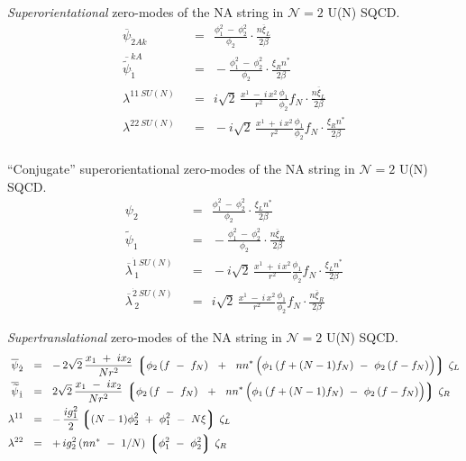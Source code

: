 \documentclass{letter}
\newcommand{\wt}{\widetilde}
\newcommand{\ov}{\overline}
\newcommand{\lgr}{\left\lgroup}
\newcommand{\rgr}{\right\rgroup}
\begin{document}
 {\it Superorientational} zero-modes of the NA string in ${\mathcal N}=2$ U(N) SQCD.
\begin{align*}
%
\overline{\psi}_{\dot{2}Ak} & ~~=~~ \frac{\phi_1^2 ~-~ \phi_2^2}{\phi_2} \cdot \frac{ n \overline{\xi}_L}{2\beta}   \\
%
\overline{\wt{\psi}}_{\dot{1}}^{kA}  & ~~=~~ - \frac{\phi_1^2 ~-~ \phi_2^2}{\phi_2} \cdot \frac{ \xi_R n^* } {2\beta} \\
%
\lambda^{11\ SU(N)} & ~~=~~ i \sqrt{2}\, \frac{ x^1 ~-~ i\, x^2 }{r^2} \frac{\phi_1}{\phi_2} f_N \cdot \frac{ n \overline{\xi}_L}{2\beta} \\
%
\lambda^{22\ SU(N)} & ~~=~~ - i \sqrt{2}\, \frac{ x^1 ~+~ i\, x^2 }{r^2} \frac{\phi_1}{\phi_2} f_N \cdot \frac{ \xi_R n^* } {2\beta} \\
\end{align*}

 ``Conjugate'' superorientational zero-modes of the NA string in ${\mathcal N}=2$ U(N) SQCD.
\begin{align*}
%
{\psi}_{2} & ~~=~~ \frac{\phi_1^2 ~-~ \phi_2^2}{\phi_2} \cdot \frac{ \xi_L n^*}{2\beta}   \\
%
\wt{\psi}_{1}  & ~~=~~ - \frac{\phi_1^2 ~-~ \phi_2^2}{\phi_2} \cdot \frac{ n \ov{\xi}_R  } {2\beta} \\
%
\ov{\lambda}^{\dot{1}\ SU(N)}_{\ 1} & ~~=~~ - i \sqrt{2}\, \frac{ x^1 ~+~ i\, x^2 }{r^2} \frac{\phi_1}{\phi_2} f_N \cdot \frac{ \xi_L n^*}{2\beta} \\
%
\ov{\lambda}^{\dot{2}\ SU(N)}_{\ 2} & ~~=~~  i \sqrt{2}\, \frac{ x^1 ~-~ i\, x^2 }{r^2} \frac{\phi_1}{\phi_2} f_N \cdot \frac{ n \ov{\xi}_R} {2\beta} 
\end{align*}

 {\it Supertranslational} zero-modes of the NA string in ${\mathcal N}=2$ U(N) SQCD.
\begin{align*}
%
\ov{\psi}_{\dot{2}}	& ~~=~~  -\,  2\sqrt{2}\, \frac{x_1 ~+~ i x_2}{N r^2} \,
		\lgr \phi_2\, (f ~-~ f_N) ~~+~~
			n n^*\, \Bigl( \phi_1\,( f + (N-1) f_N) ~-~ \phi_2\, (f - f_N) \Bigr) 
		\rgr\, \zeta_L 
		\\
%
\ov{\wt{\psi}}_{\dot{1}} & ~~=~~    2\sqrt{2} \, \frac{x_1 ~-~ i x_2}{N r^2} \,
		\lgr \phi_2\, (f ~-~ f_N) ~~+~~
			n n^*\, \Bigl( \phi_1\,( f + (N-1) f_N) ~-~ \phi_2\, (f - f_N) \Bigr) 
		\rgr\, \zeta_R
		\\
%
\lambda^{11} 	& ~~=~~ -\, \frac{i g_1^2}{2} \lgr (N-1)\phi_2^2  ~+~ \phi_1^2 ~-~ N\xi \rgr \, \zeta_L 
		\\
%
\lambda^{22}	& ~~=~~ +\, {i g_2^2}\, ( nn^* ~-~ 1/N )\, \lgr \phi_1^2 ~-~ \phi_2^2 \rgr\, \zeta_R
\end{align*}
\end{document}
